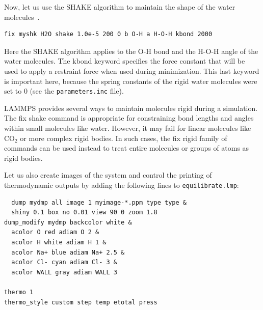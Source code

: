 \documentclass[9pt,tutorial]{livecoms}
\newcommand{\lmpcmd}[1]{\hspace{0pt}\colorbox{listing}{\textcolor{command}{\small{#1}}}\hspace{0pt}} %
\newcommand{\flecmd}[1]{\textcolor{command}{\texttt{#1}}} %
\begin{document}
Now, let us use the SHAKE algorithm to maintain the shape of the
water molecules~\cite{ryckaert1977numerical, andersen1983rattle}.
\begin{lstlisting}
fix myshk H2O shake 1.0e-5 200 0 b O-H a H-O-H kbond 2000
\end{lstlisting}
Here the SHAKE algorithm applies to the \lmpcmd{O-H} bond and the \lmpcmd{H-O-H} angle
of the water molecules.  The \lmpcmd{kbond} keyword specifies the force constant that will be
used to apply a restraint force when used during minimization.  This last keyword is important
here, because the spring constants of the rigid water molecules were set
to 0 (see the \flecmd{parameters.inc} file).

\begin{note}
{\color{blue}
LAMMPS provides several ways to maintain molecules rigid during a simulation. 
The \lmpcmd{fix shake} command is appropriate for constraining bond lengths 
and angles within small molecules like water. 
However, it may fail for linear molecules like CO$_2$ or more complex rigid bodies. 
In such cases, the \lmpcmd{fix rigid} family of commands can be used instead to
treat entire molecules or groups of atoms as rigid bodies.}
\end{note}

Let us also create images of the system and control
the printing of thermodynamic outputs by adding the following lines
to \flecmd{equilibrate.lmp}:
\begin{lstlisting}
  dump mydmp all image 1 myimage-*.ppm type type &
  shiny 0.1 box no 0.01 view 90 0 zoom 1.8
dump_modify mydmp backcolor white &
  acolor O red adiam O 2 &
  acolor H white adiam H 1 &
  acolor Na+ blue adiam Na+ 2.5 &
  acolor Cl- cyan adiam Cl- 3 &
  acolor WALL gray adiam WALL 3

thermo 1
thermo_style custom step temp etotal press
\end{lstlisting}
\end{document}
